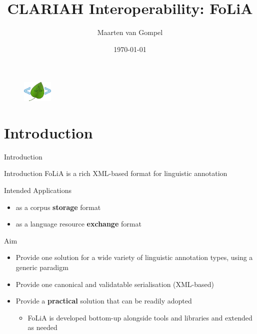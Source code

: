 \documentclass[xcolor=table,10pt,t]{beamer}
\title{CLARIAH Interoperability: FoLiA}
\date{\today}
\author{Maarten van Gompel}
\begin{document}
\begin{frame}
    \titlepage{}
        \begin{figure}
        \includegraphics[height=1cm]{../logo.png}
        \end{figure}
        \vspace{3.5cm}
\end{frame}

\section{Introduction}

\begin{frame}{Introduction}
    \begin{block}{Introduction}
        FoLiA is a rich XML-based format for linguistic annotation
    \end{block}

	\begin{block}{Intended Applications}
		\begin{itemize}
			\item as a corpus \textbf{storage} format
			\item as a language resource \textbf{exchange} format 
		\end{itemize}				
	\end{block}

    \begin{block}{Aim}
        \begin{itemize}
        \item Provide one solution for a wide variety of linguistic annotation types, using a generic paradigm 
        \item Provide one canonical and validatable serialisation (XML-based)
        \item Provide a \textbf{practical} solution that can be readily adopted
        \begin{itemize}
            \item FoLiA is developed bottom-up alongside tools and libraries and extended as needed
        \end{itemize}
        \end{itemize}
    \end{block}
\end{frame}
\end{document}
